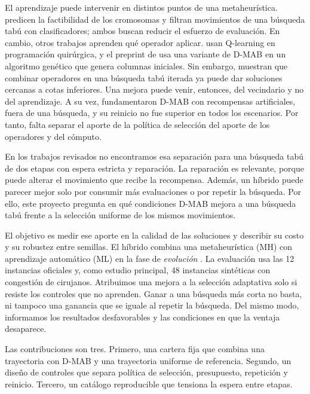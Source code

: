 \documentclass[12pt,letterpaper]{report}
\begin{document}
El aprendizaje puede intervenir en distintos puntos de una metaheurística.
\textcite{akbarzadeh2024} predicen la factibilidad de los cromosomas y
\textcite{niroumandrad2024} filtran movimientos de una búsqueda tabú con
clasificadores; ambos buscan reducir el esfuerzo de evaluación. En cambio, otros
trabajos aprenden qué operador aplicar. \textcite{yu2024} usan Q-learning en
programación quirúrgica, y el preprint de \textcite{dolatkhah2026} usa una variante
de D-MAB en un algoritmo genético que genera columnas iniciales. Sin embargo,
\textcite{yin2026} muestran que combinar operadores en una búsqueda tabú iterada
ya puede dar soluciones cercanas a cotas inferiores. Una mejora puede venir,
entonces, del vecindario y no del aprendizaje. A su vez, \textcite{dacosta2008}
fundamentaron D-MAB con recompensas artificiales, fuera de una búsqueda, y su
reinicio no fue superior en todos los escenarios. Por tanto, falta separar el
aporte de la política de selección del aporte de los operadores y del cómputo.

En los trabajos revisados no encontramos esa separación para una búsqueda tabú de
dos etapas con espera estricta y reparación. La reparación es relevante, porque
puede alterar el movimiento que recibe la recompensa. Además, un híbrido puede
parecer mejor solo por consumir más evaluaciones o por repetir la búsqueda. Por
ello, este proyecto pregunta en qué condiciones D-MAB mejora a una búsqueda tabú
frente a la selección uniforme de los mismos movimientos.

El objetivo es medir ese aporte en la calidad de las soluciones y describir su
costo y su robustez entre semillas. El híbrido combina una metaheurística (MH)
con aprendizaje automático (ML) en la fase de \emph{evolución}
\parencite{vega_taxonomia}. La evaluación usa las 12 instancias oficiales
\parencite{saicooh2026} y, como estudio principal, 48 instancias sintéticas con
congestión de cirujanos.
Atribuimos una mejora a la selección adaptativa solo si resiste los controles que no aprenden.
Ganar a una búsqueda más corta no basta, ni tampoco una ganancia que se iguale al
repetir la búsqueda. Del mismo modo, informamos los resultados desfavorables y las
condiciones en que la ventaja desaparece.

Las contribuciones son tres. Primero, una cartera fija que combina una trayectoria
con D-MAB y una trayectoria uniforme de referencia. Segundo, un diseño de controles
que separa política de selección, presupuesto, repetición y reinicio. Tercero, un catálogo
reproducible que tensiona la espera entre etapas.
\end{document}
